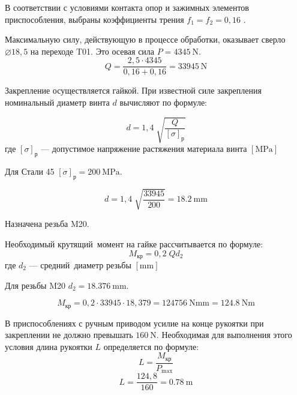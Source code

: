 \documentclass[14pt,russian,a4paper]{extreport}
\begin{document}
В соответствии с условиями контакта опор и зажимных элементов приспособления, выбраны коэффициенты трения $ f_1 = f_2 = 0,16 $ \cite[с.~85, табл.~10]{kosilova:stm2}.

Максимальную силу, действующую в процессе обработки, оказывает сверло $\diameter 18,5$ на переходе T01. Это осевая сила $ P = \SI{4345}{\newton} $.
\begin{equation*}
  Q = \frac{2,5 \cdot 4345}{0,16 + 0,16} = \SI{33945}{\newton}
\end{equation*}

Закрепление осуществляется гайкой. При известной силе закрепления номинальный диаметр винта $d$ вычисляют по формуле:

\begin{equation}
  d = 1,4 \; \sqrt{\frac{Q}{\left[\sigma\right]_\text{р}}}
\end{equation}
где $\left[\sigma\right]_\text{р}$ --- допустимое напряжение растяжения материала винта $\left[\si{\mega\pascal}\right]$

Для Стали 45 $ \left[\sigma\right]_\text{р} = \SI{200}{\mega\pascal} $.

\begin{equation*}
  d = 1,4 \; \sqrt{\frac{33945}{200}} = \SI{18,2}{\milli\meter}
\end{equation*}

Назначена резьба M20.

Необходимый крутящий момент на гайке рассчитывается по формуле: \cite[с.~87]{kosilova:stm2}
\begin{equation}
  M_\text{кр} = 0,2 \; Q d_2
\end{equation}
где $d_2$ --- средний диаметр резьбы $\left[\si{\milli\meter}\right]$

Для резьбы M20 $ d_2 = \SI{18,376}{\milli\meter} $.

\begin{equation*}
  M_\text{кр} = 0,2 \cdot 33945 \cdot 18,379 = \SI{124756}{\newton\milli\meter} = \SI{124,8}{\newton\meter}
\end{equation*}

В приспособлениях с ручным приводом усилие на конце рукоятки при закреплении не должно превышать $\SI{160}{\newton}$. Необходимая для выполнения этого условия длина рукоятки $L$ определяется по формуле:
\begin{equation}
  L = \frac{M_\text{кр}}{P_\text{max}}
\end{equation}
\begin{equation*}
  L = \frac{124,8}{160} = \SI{0,78}{\meter}
\end{equation*}
\end{document}
